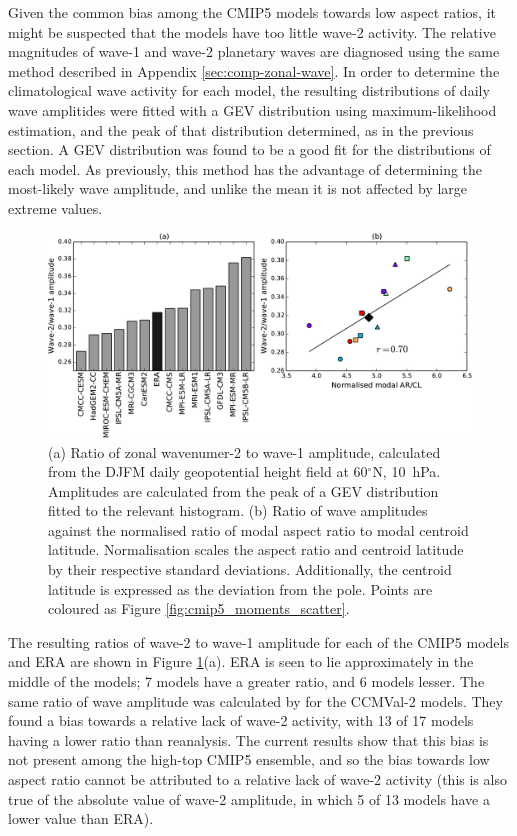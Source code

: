 Given the common bias among the CMIP5 models towards low aspect ratios, it might
be suspected that the models have too little wave-2 activity. The relative
magnitudes of wave-1 and wave-2 planetary waves are diagnosed using the same
method described in Appendix \ref{sec:comp-zonal-wave}. In order to determine
the climatological wave activity for each model, the resulting distributions of
daily wave amplitides were fitted with a GEV distribution using
maximum-likelihood estimation, and the peak of that distribution determined, as
in the previous section. A GEV distribution was found to be a good fit for the
distributions of each model. As previously, this method has the advantage of
determining the most-likely wave amplitude, and unlike the mean it is not
affected by large extreme values.

\begin{figure}
 \centering
 \noindent\includegraphics[width=\textwidth]{figures/chapter-models/CMIP5_waves_nolegend.pdf}
 \caption[CMIP5 wave diagnostics]{(a) Ratio of zonal wavenumer-2 to wave-1
   amplitude, calculated from the DJFM daily geopotential height field at
   60$^{\circ}$N, 10~hPa. Amplitudes are calculated from the peak of a GEV
   distribution fitted to the relevant histogram. (b) Ratio of wave amplitudes
   against the normalised ratio of modal aspect ratio to modal centroid
   latitude. Normalisation scales the aspect ratio and centroid latitude by
   their respective standard deviations. Additionally, the centroid latitude is
   expressed as the deviation from the pole. Points are coloured as Figure
   \ref{fig:cmip5_moments_scatter}.}
 \label{fig:cmip5_waves}
\end{figure}

The resulting ratios of wave-2 to wave-1 amplitude for each of the
CMIP5 models and ERA are shown in Figure \ref{fig:cmip5_waves}(a). ERA is seen
to lie approximately in the middle of the models; 7 models have a greater ratio,
and 6 models lesser. The same ratio of wave amplitude was calculated by
\citet{Butchart2011} for the CCMVal-2 models. They found a bias towards a
relative lack of wave-2 activity, with 13 of 17 models having a lower
ratio than reanalysis. The current results show that this bias is not present
among the high-top CMIP5 ensemble, and so the bias towards low aspect ratio
cannot be attributed to a relative lack of wave-2 activity (this is also
true of the absolute value of wave-2 amplitude, in which 5 of 13 models
have a lower value than ERA).

